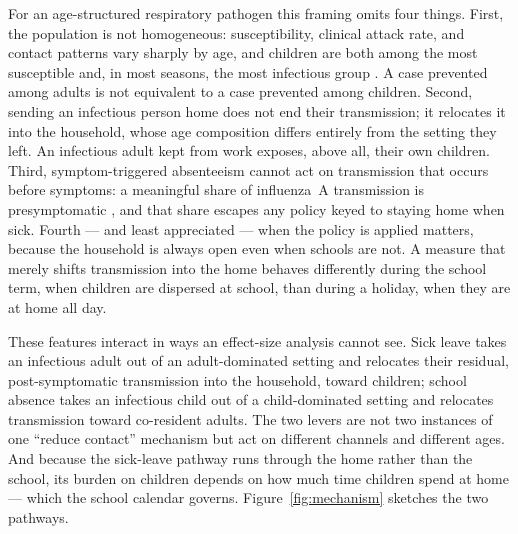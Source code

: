\documentclass[12pt]{article}
\theoremstyle{plain}
\theoremstyle{remark}
\theoremstyle{definition}
\begin{document}
For an age-structured respiratory pathogen this framing omits four things. First, the population is not homogeneous: susceptibility, clinical attack rate, and contact patterns vary sharply by age, and children are both among the most susceptible and, in most seasons, the most infectious group \cite{Jayasundara2014,Cauchemez2009}. A case prevented among adults is not equivalent to a case prevented among children. Second, sending an infectious person home does not end their transmission; it relocates it into the household, whose age composition differs entirely from the setting they left. An infectious adult kept from work exposes, above all, their own children. Third, symptom-triggered absenteeism cannot act on transmission that occurs before symptoms: a meaningful share of influenza~A transmission is presymptomatic \cite{NatureHealth2026,Lau2010}, and that share escapes any policy keyed to staying home when sick. Fourth --- and least appreciated --- when the policy is applied matters, because the household is always open even when schools are not. A measure that merely shifts transmission into the home behaves differently during the school term, when children are dispersed at school, than during a holiday, when they are at home all day.

These features interact in ways an effect-size analysis cannot see. Sick leave takes an infectious adult out of an adult-dominated setting and relocates their residual, post-symptomatic transmission into the household, toward children; school absence takes an infectious child out of a child-dominated setting and relocates transmission toward co-resident adults. The two levers are not two instances of one ``reduce contact'' mechanism but act on different channels and different ages. And because the sick-leave pathway runs through the home rather than the school, its burden on children depends on how much time children spend at home --- which the school calendar governs. Figure~\ref{fig:mechanism} sketches the two pathways.
\end{document}
